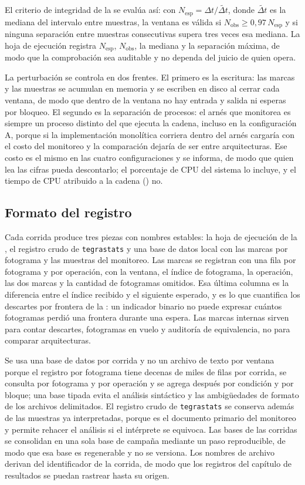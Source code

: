 El criterio de integridad de la  se evalúa así: con
$N_{\text{esp}} = \Delta t / \tilde{\Delta t}$, donde $\tilde{\Delta t}$ es
la mediana del intervalo entre muestras, la ventana es válida si
$N_{\text{obs}} \geq 0{,}97\,N_{\text{esp}}$ y si ninguna separación entre
muestras consecutivas supera tres veces esa mediana. La hoja de ejecución
registra $N_{\text{esp}}$, $N_{\text{obs}}$, la mediana y la separación
máxima, de modo que la comprobación sea auditable y no dependa del juicio de
quien opera.

La perturbación se controla en dos frentes. El primero es la escritura: las
marcas y las muestras se acumulan en memoria y se escriben en disco al cerrar
cada ventana, de modo que dentro de la ventana no hay entrada y salida ni
esperas por bloqueo. El segundo es la separación de procesos: el arnés que
monitorea es siempre un proceso distinto del que ejecuta la cadena, incluso en
la configuración A, porque si la implementación monolítica corriera dentro del
arnés cargaría con el costo del monitoreo y la comparación dejaría de ser
entre arquitecturas. Ese costo es el mismo en las cuatro configuraciones y se
informa, de modo que quien lea las cifras pueda descontarlo; el porcentaje de
CPU del sistema lo incluye, y el tiempo de CPU atribuido a la cadena
() no.

\subsection{Formato del registro}
\label{sec:data-format}

Cada corrida produce tres piezas con nombres estables: la hoja de ejecución de
la , el registro crudo de \texttt{tegrastats} y una
base de datos local con las marcas por fotograma y las muestras del
monitoreo. Las marcas se registran con una fila por fotograma y por operación,
con la ventana, el índice de fotograma, la operación, las dos marcas y la
cantidad de fotogramas omitidos. Esa última columna es la diferencia entre el
índice recibido y el siguiente esperado, y es lo que cuantifica los descartes
por frontera de la : un indicador binario no puede expresar
cuántos fotogramas perdió una frontera durante una espera. Las marcas internas
sirven para contar descartes, fotogramas en vuelo y auditoría de equivalencia,
no para comparar arquitecturas.

Se usa una base de datos por corrida y no un archivo de texto por ventana
porque el registro por fotograma tiene decenas de miles de filas por corrida,
se consulta por fotograma y por operación y se agrega después por condición y
por bloque; una base tipada evita el análisis sintáctico y las ambigüedades de
formato de los archivos delimitados. El registro crudo de \texttt{tegrastats}
se conserva además de las muestras ya interpretadas, porque es el documento
primario del monitoreo y permite rehacer el análisis si el intérprete se
equivoca. Las bases de las corridas se consolidan en una sola base de campaña
mediante un paso reproducible, de modo que esa base es regenerable y no se
versiona. Los nombres de archivo derivan del identificador de la corrida, de
modo que los registros del capítulo de resultados se puedan rastrear hasta su
origen.

